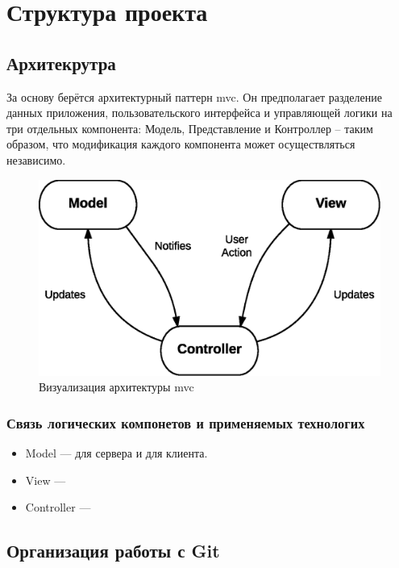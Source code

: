\section{Структура проекта}

\subsection{Архитекрутра}
За основу берётся архитектурный паттерн \acrshort{mvc}. Он предполагает разделение данных приложения, пользовательского интерфейса и управляющей логики на три отдельных компонента: Модель, Представление и Контроллер – таким образом, что модификация каждого компонента может осуществляться независимо.

\begin{figure}[h]
    \begin{center}
        \includegraphics[scale=0.7]{images/MVC-basic.eps}
    \end{center}
    \caption{Визуализация архитектуры \acrshort{mvc}}
\end{figure}

\subsubsection{Связь логических компонетов и применяемых технологих}
\begin{itemize}
    \item Model --- \textcite{seqorm} для сервера и \textcite{redux} для клиента.
    \item View --- \textcite{react}
    \item Controller --- \textcite{express}
\end{itemize}

\subsection{Организация работы с Git}

